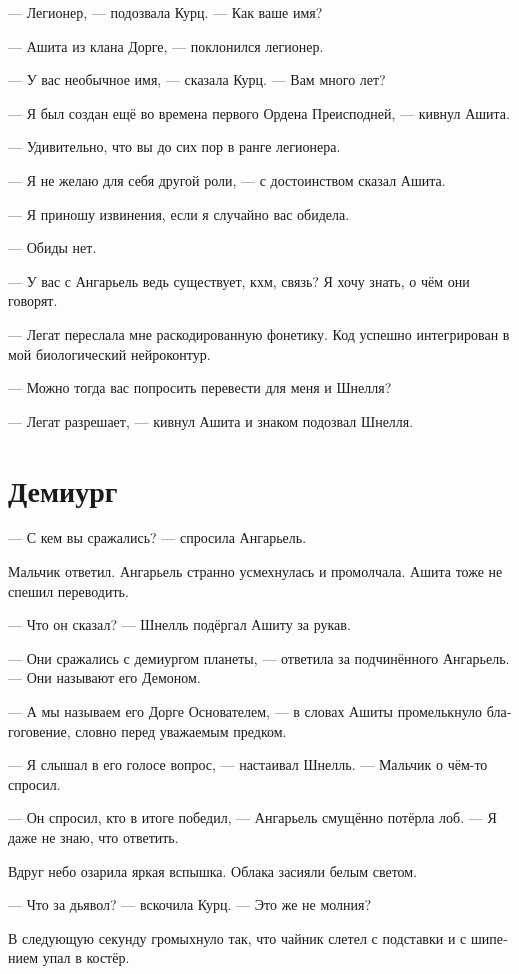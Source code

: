 \documentclass[a4paper,12pt,fleqn]{book}\usepackage{cooltooltips}\usepackage{polyglossia}\setdefaultlanguage[babelshorthands=true]{russian}\setotherlanguage{english}\defaultfontfeatures{Ligatures=TeX,Mapping=tex-text} \usepackage{xcolor}\definecolor{lightgray}{HTML}{bbbbbb}\color{lightgray}\newcommand{\ml}[3]{\textenglish{\textcolor{black}{#3}}}
\begin{document}
--- Легионер, --- подозвала Курц.
--- Как ваше имя?

--- Ашита из клана Дорге, --- поклонился легионер.

--- У вас необычное имя, --- сказала Курц.
--- Вам много лет?

--- Я был создан ещё во времена первого Ордена Преисподней, --- кивнул Ашита.

--- Удивительно, что вы до сих пор в ранге легионера.

--- Я не желаю для себя другой роли, --- с достоинством сказал Ашита.

--- Я приношу извинения, если я случайно вас обидела.

--- Обиды нет.

--- У вас с Ангарьель ведь существует, кхм, связь?
Я хочу знать, о чём они говорят.

--- Легат переслала мне раскодированную фонетику.
Код успешно интегрирован в мой биологический нейроконтур.

--- Можно тогда вас попросить перевести для меня и Шнелля?

--- Легат разрешает, --- кивнул Ашита и знаком подозвал Шнелля.

\section{Демиург}

--- С кем вы сражались? --- спросила Ангарьель.

Мальчик ответил.
Ангарьель странно усмехнулась и промолчала.
Ашита тоже не спешил переводить.

--- Что он сказал? --- Шнелль подёргал Ашиту за рукав.

--- Они сражались с демиургом планеты, --- ответила за подчинённого Ангарьель.
--- Они называют его Демоном.

--- А мы называем его Дорге Основателем, --- в словах Ашиты промелькнуло благоговение, словно перед уважаемым предком.

--- Я слышал в его голосе вопрос, --- настаивал Шнелль.
--- Мальчик о чём-то спросил.

--- Он спросил, кто в итоге победил, --- Ангарьель смущённо потёрла лоб.
--- Я даже не знаю, что ответить.

Вдруг небо озарила яркая вспышка.
Облака засияли белым светом.

--- Что за дьявол? --- вскочила Курц.
--- Это же не молния?

В следующую секунду громыхнуло так, что чайник слетел с подставки и с шипением упал в костёр.
\end{document}

